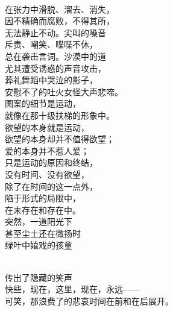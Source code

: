 \documentclass{article}
\begin{document}
\newpage 


\\
在张力中滑脱、溜去、消失，\\
因不精确而腐败，不得其所，\\
无法静止不动。尖叫的嗓音\\
斥责、嘲笑、喋喋不休，\\
总在袭击言词。沙漠中的道\\
尤其遭受诱惑的声音攻击，\\
葬礼舞蹈中哭泣的影子，\\
安慰不了的吐火女怪大声悲啼。\\
图案的细节是运动，\\
就像在那十级扶梯的形象中。\\
欲望的本身就是运动，\\
欲望的本身却并不值得欲望；\\
爱的本身并不惹人爱；\\
只是运动的原因和终结，\\
没有时间、没有欲望，\\
除了在时间的这一点外，\\
陷于形式的局限中，\\
在未存在和存在中。\\
突然，一道阳光下\\
甚至尘土还在微扬时\\
绿叶中嬉戏的孩童

\newpage 


\\
传出了隐藏的笑声\\
快些，现在，这里，现在，永远——\\
可笑，那浪费了的悲哀时间在前和在后展开。
\end{document}
